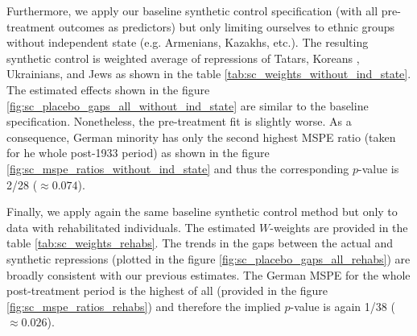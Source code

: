 Furthermore, we apply our baseline  synthetic control specification (with all pre-treatment outcomes as predictors) but only limiting ourselves to ethnic groups without independent state (e.g. Armenians, Kazakhs, etc.). The resulting synthetic control is weighted average of repressions of Tatars, Koreans , Ukrainians, and Jews as shown in the table \ref{tab:sc_weights_without_ind_state}. The estimated effects shown in the figure \ref{fig:sc_placebo_gaps_all_without_ind_state} are  similar to the baseline specification. Nonetheless, the pre-treatment fit is slightly worse. As a consequence, German minority has only the second highest MSPE ratio (taken for he whole post-1933 period) as shown in the figure \ref{fig:sc_mspe_ratios_without_ind_state} and thus the corresponding $p$-value is 2/28 ($\approx 0.074$).

Finally, we apply again the same baseline synthetic control method but only to data with rehabilitated individuals. The estimated $W$-weights are provided in the table \ref{tab:sc_weights_rehabs}. The trends in the gaps between the actual and synthetic repressions (plotted in the figure  \ref{fig:sc_placebo_gaps_all_rehabs}) are broadly consistent with  our previous estimates. 
The German MSPE for the whole post-treatment period is the highest of all (provided in the figure \ref{fig:sc_mspe_ratios_rehabs}) and therefore the implied $p$-value is again  1/38 ($\approx 0.026$).

%
%

